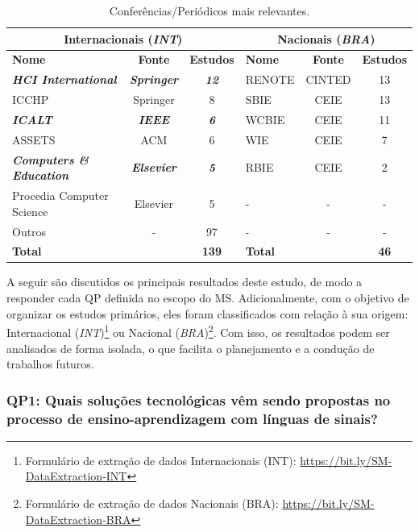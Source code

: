\begin{table}[htb]
\caption{Conferências/Periódicos mais relevantes.}
\label{table:c2:publication-venues}
\centering
\begin{tabular}{lcc|lcc} \hline
\multicolumn{3}{c|}{\textbf{Internacionais (\textit{INT})}} & \multicolumn{3}{c}{\textbf{Nacionais (\textit{BRA})}} \\ \hline
\textbf{Nome} & \textbf{Fonte} & \textbf{Estudos} & \textbf{Nome} & \textbf{Fonte} & \textbf{Estudos} \\ \hline
\textit{\textbf{HCI International}} & \textit{\textbf{Springer}} & \textit{\textbf{12}} & RENOTE & CINTED & 13 \\ 
ICCHP & Springer & 8 & SBIE & CEIE & 13 \\ 
\textit{\textbf{ICALT}} & \textit{\textbf{IEEE}} & \textit{\textbf{6}} & WCBIE & CEIE & 11 \\ 
ASSETS & ACM & 6 & WIE & CEIE & 7 \\ 
\textit{\textbf{Computers \& Education}} & \textit{\textbf{Elsevier}} & \textit{\textbf{5}} & RBIE & CEIE & 2 \\ 
Procedia Computer Science & Elsevier & 5 & - & - & - \\ 
Outros & - & 97 & - & - & - \\ \hline
\multicolumn{2}{l}{\textbf{Total}} & \textbf{139} & \multicolumn{2}{l}{\textbf{Total}} & \textbf{46} \\ \hline
\end{tabular}
\end{table}

A seguir são discutidos os principais resultados deste estudo, de modo a responder cada QP definida no escopo do MS. Adicionalmente, com o objetivo de organizar os estudos primários, eles foram classificados com relação à sua origem: Internacional (\textit{INT})\footnote{Formulário de extração de dados Internacionais (INT): \url{https://bit.ly/SM-DataExtraction-INT}} ou Nacional (\textit{BRA})\footnote{Formulário de extração de dados Nacionais (BRA): \url{https://bit.ly/SM-DataExtraction-BRA}}. Com isso, os resultados podem ser analisados de forma isolada, o que facilita o planejamento e a condução de trabalhos futuros.

\subsubsection{QP1: Quais soluções tecnológicas vêm sendo propostas no processo de ensino-aprendizagem com línguas de sinais?}

